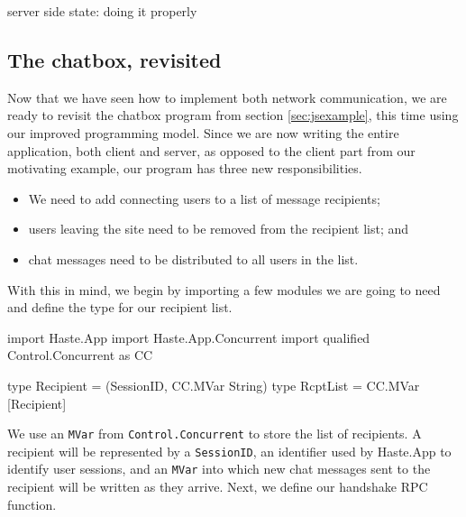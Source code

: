 \documentclass[preprint]{sigplanconf}
\begin{document}
\begin{listingfloat}
\caption{server side state: doing it properly}
\label{lst:good-state}
\end{listingfloat}

\subsection{The chatbox, revisited}\label{sec:chatboxrevisited}

Now that we have seen how to implement both network communication, we are ready
to revisit the chatbox program from section \ref{sec:jsexample}, this time
using our improved programming model. Since we are now writing the entire
application, both client and server, as opposed to the client part from our
motivating example, our program has three new responsibilities.

\begin{itemize}
  \item We need to add connecting users to a list of message recipients;
  \item users leaving the site need to be removed from the recipient list; and
  \item chat messages need to be distributed to all users in the list.
\end{itemize}

With this in mind, we begin by importing a few modules we are going to need and
define the type for our recipient list.

\begin{code}
import Haste.App
import Haste.App.Concurrent
import qualified Control.Concurrent as CC

type Recipient = (SessionID, CC.MVar String)
type RcptList = CC.MVar [Recipient]
\end{code}

We use an \lstinline!MVar! from \lstinline!Control.Concurrent! to store the
list of recipients. A recipient will be represented by a \lstinline!SessionID!,
an identifier used by Haste.App to identify user sessions, and an
\lstinline!MVar! into which new chat messages sent to the recipient will be
written as they arrive. Next, we define our handshake RPC function.
\end{document}
